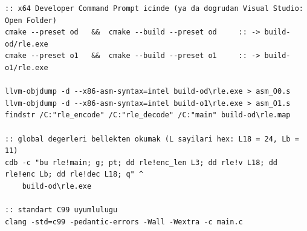 \documentclass[11pt,a4paper]{article}
\begin{document}
\begin{verbatim}
:: x64 Developer Command Prompt icinde (ya da dogrudan Visual Studio: Open Folder)
cmake --preset od   &&  cmake --build --preset od     :: -> build-od/rle.exe
cmake --preset o1   &&  cmake --build --preset o1     :: -> build-o1/rle.exe

llvm-objdump -d --x86-asm-syntax=intel build-od\rle.exe > asm_O0.s
llvm-objdump -d --x86-asm-syntax=intel build-o1\rle.exe > asm_O1.s
findstr /C:"rle_encode" /C:"rle_decode" /C:"main" build-od\rle.map

:: global degerleri bellekten okumak (L sayilari hex: L18 = 24, Lb = 11)
cdb -c "bu rle!main; g; pt; dd rle!enc_len L3; dd rle!v L18; dd rle!enc Lb; dd rle!dec L18; q" ^
    build-od\rle.exe

:: standart C99 uyumlulugu
clang -std=c99 -pedantic-errors -Wall -Wextra -c main.c
\end{verbatim}
\end{document}
